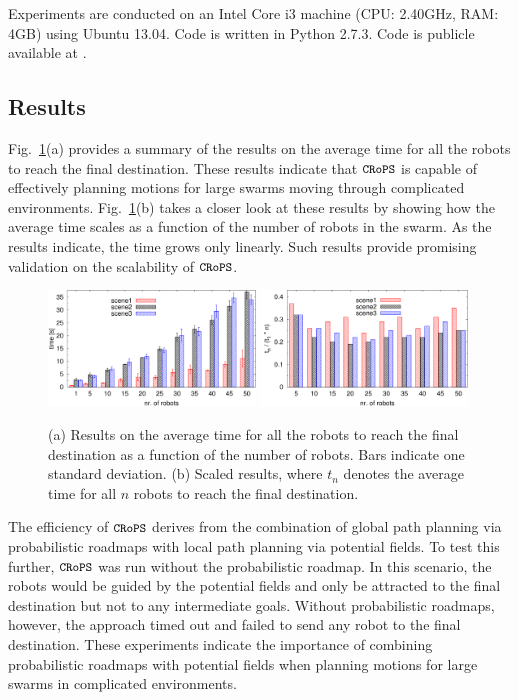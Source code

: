 \documentclass{llncs}
\newcommand{\Acronym}[1]{\ensuremath{{\small{\texttt{#1}}}}}
\newcommand{\Var}[1]{\ensuremath{{\small{\textsl{#1}}}}}
\newcommand{\Name}{\Acronym{CRoPS}}
\begin{document}

Experiments are conducted on an Intel Core i3 machine (CPU: 2.40GHz,
RAM: 4GB) using Ubuntu 13.04. Code is written in Python 2.7.3. Code is
publicle available at \cite{CodeBoids}.

\subsection{Results}
\label{sec:Results}

Fig.~\ref{fig:ResT}(a) provides a summary of the results on the
average time for all the robots to reach the final
destination. These results indicate that $\Name$ is capable of
effectively planning motions for large swarms moving through
complicated environments. Fig.~\ref{fig:ResT}(b) takes a closer
look at these results by showing how
the average time scales as a function of the number of robots in the
swarm. As the results indicate, the time grows only linearly. Such
results provide promising validation on the scalability of $\Name$. 

\begin{figure}
\centering
\includegraphics[width=0.49\textwidth]{figResT}
\includegraphics[width=0.49\textwidth]{figResST}
\caption{(a) Results on the average time for all the robots to reach the
  final destination as a function of the number of robots. Bars
  indicate one standard deviation. (b) Scaled results, where $t_n$
  denotes the average time for all $n$ robots to reach the final destination.}
\label{fig:ResT}
\end{figure}

\noindent
The efficiency of $\Name$ derives from the combination of global path
planning via probabilistic roadmaps with local path planning via
potential fields.  To test this further, $\Name$ was run without the
probabilistic roadmap. In this scenario, the robots would be guided by
the potential fields and only be attracted to the final destination
but not to any intermediate goals. Without probabilistic roadmaps,
however, the approach timed out and failed to send any robot to the
final destination. These experiments indicate the importance of
combining probabilistic roadmaps with potential fields when planning
motions for large swarms in complicated environments.
\end{document}
